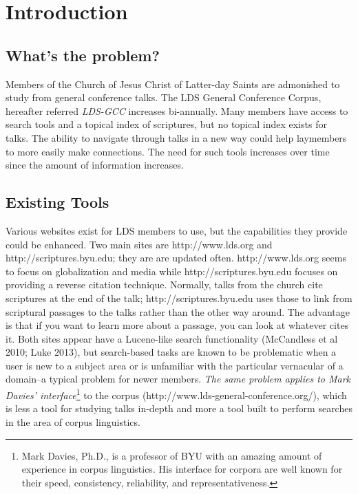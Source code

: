 \section {Introduction}


\subsection {What's the problem?}
Members of the Church of Jesus Christ of Latter-day Saints are admonished to study from general conference talks. The LDS General Conference Corpus, hereafter referred \emph{LDS-GCC} increases bi-annually. Many members have access to search tools and a topical index of scriptures, but no topical index exists for talks. The ability to navigate through talks in a new way could help laymembers to more easily make connections. The need for such tools increases over time since the amount of information increases. 

\subsection{Existing Tools}
Various websites exist for LDS members to use, but the capabilities they provide could be enhanced. Two main sites are http://www.lds.org and http://scriptures.byu.edu; they are are updated often. http://www.lds.org seems to focus on globalization and media while http://scriptures.byu.edu focuses on providing a reverse citation technique. Normally, talks from the church cite scriptures at the end of the talk; http://scriptures.byu.edu uses those to link from scriptural passages to the talks rather than the other way around. The advantage is that if you want to learn more about a passage, you can look at whatever cites it. Both sites appear have a Lucene-like search functionality (McCandless et al 2010; Luke 2013), but search-based tasks are known to be problematic when a user is new to a subject area or is unfamiliar with the particular vernacular of a domain--a typical problem for newer members. \emph{The same problem applies to Mark Davies' interface}\footnote{Mark Davies, Ph.D., is a professor of BYU with an amazing amount of experience in corpus linguistics. His interface for corpora are well known for their speed, consistency, reliability, and representativeness.} to the corpus (http://www.lds-general-conference.org/), which is less a tool for studying talks in-depth and more a tool built to perform searches in the area of corpus linguistics.

